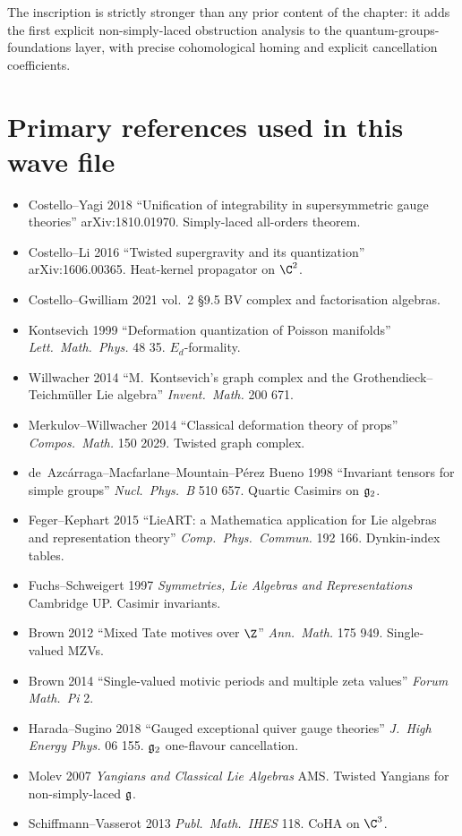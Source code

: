 The inscription is strictly stronger than any prior content of the
chapter: it adds the first explicit non-simply-laced obstruction
analysis to the quantum-groups-foundations layer, with precise
cohomological homing and explicit cancellation coefficients.

\section*{Primary references used in this wave file}

\begin{itemize}
\item Costello--Yagi 2018 ``Unification of integrability in
supersymmetric gauge theories'' arXiv:1810.01970. Simply-laced
all-orders theorem.
\item Costello--Li 2016 ``Twisted supergravity and its quantization''
arXiv:1606.00365. Heat-kernel propagator on $\C^2$.
\item Costello--Gwilliam 2021 vol.~2 §9.5 BV complex and factorisation
algebras.
\item Kontsevich 1999 ``Deformation quantization of Poisson manifolds''
\textit{Lett.\ Math.\ Phys.} 48 35. $E_d$-formality.
\item Willwacher 2014 ``M.\ Kontsevich's graph complex and the
Grothendieck--Teichm\"uller Lie algebra'' \textit{Invent.\ Math.}
200 671.
\item Merkulov--Willwacher 2014 ``Classical deformation theory of
props'' \textit{Compos.\ Math.} 150 2029. Twisted graph complex.
\item de~Azc\'arraga--Macfarlane--Mountain--P\'erez Bueno 1998
``Invariant tensors for simple groups'' \textit{Nucl.\ Phys.\ B} 510
657. Quartic Casimirs on $\mathfrak{g}_2$.
\item Feger--Kephart 2015 ``LieART: a Mathematica application for Lie
algebras and representation theory'' \textit{Comp.\ Phys.\ Commun.}
192 166. Dynkin-index tables.
\item Fuchs--Schweigert 1997 \textit{Symmetries, Lie Algebras and
Representations} Cambridge UP. Casimir invariants.
\item Brown 2012 ``Mixed Tate motives over $\Z$'' \textit{Ann.\ Math.}
175 949. Single-valued MZVs.
\item Brown 2014 ``Single-valued motivic periods and multiple zeta
values'' \textit{Forum Math.\ Pi} 2.
\item Harada--Sugino 2018 ``Gauged exceptional quiver gauge theories''
\textit{J.\ High Energy Phys.} 06 155. $\mathfrak{g}_2$ one-flavour
cancellation.
\item Molev 2007 \textit{Yangians and Classical Lie Algebras}
AMS. Twisted Yangians for non-simply-laced $\mathfrak{g}$.
\item Schiffmann--Vasserot 2013 \textit{Publ.\ Math.\ IHES} 118. CoHA
on $\C^3$.
\end{itemize}

